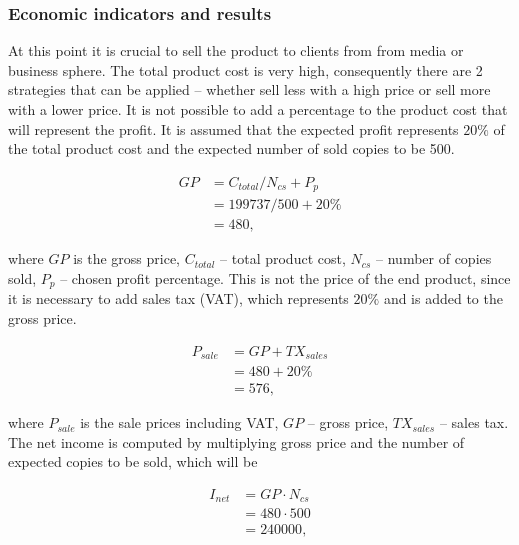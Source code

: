 \subsubsection{Economic indicators and results}
At this point it is crucial to sell the product to clients from from media or business sphere. The total product cost is very high, consequently there are 2 strategies that can be applied -- whether sell less with a high price or sell more with a lower price. It is not possible to add a percentage to the product cost that will represent the profit. It is assumed that the expected profit represents $20\%$ of the total product cost and the expected number of sold copies to be 500.

\begin{equation}
 \begin{split}
  GP &= C_{total} / N_{cs} + P_{p}\\
              &= 199737/500 + 20\% \\
              &= 480,
 \end{split}
\end{equation}

\noindent
where $GP$ is the gross price, $C_{total}$ -- total product cost, $N_{cs}$ -- number of copies sold, $P_{p}$ -- chosen profit percentage. This is not the price of the end product, since it is necessary to add sales tax (VAT), which represents $20\%$ and is added to the gross price. 

\begin{equation}
 \begin{split}
  P_{sale} &= GP + TX_{sales}\\
              &= 480 + 20\% \\
              &= 576,
 \end{split}
\end{equation}

\noindent
where $P_{sale}$ is the sale prices including VAT, $GP$ -- gross price, $TX_{sales}$ -- sales tax. The net income is computed by multiplying gross price and the number of expected copies to be sold, which will be

\begin{equation}
 \begin{split}
  I_{net} &= GP \cdot N_{cs}\\
              &= 480  \cdot 500 \\
              &= 240000,
 \end{split}
\end{equation}

